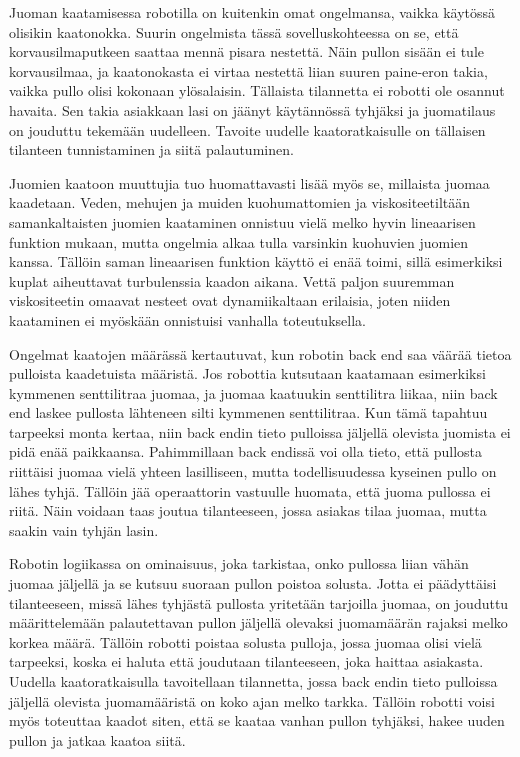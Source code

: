 Juoman kaatamisessa robotilla on kuitenkin omat ongelmansa, vaikka käytössä olisikin kaatonokka. Suurin ongelmista tässä sovelluskohteessa on se, että korvausilmaputkeen saattaa mennä pisara nestettä. Näin pullon sisään ei tule korvausilmaa, ja kaatonokasta ei virtaa nestettä liian suuren paine-eron takia, vaikka pullo olisi kokonaan ylösalaisin. Tällaista tilannetta ei robotti ole osannut havaita. Sen takia asiakkaan lasi on jäänyt käytännössä tyhjäksi ja juomatilaus on jouduttu tekemään uudelleen. Tavoite uudelle kaatoratkaisulle on tällaisen tilanteen tunnistaminen ja siitä palautuminen.

Juomien kaatoon muuttujia tuo huomattavasti lisää myös se, millaista juomaa kaadetaan. Veden, mehujen ja muiden kuohumattomien ja viskositeetiltään samankaltaisten juomien kaataminen onnistuu vielä melko hyvin lineaarisen funktion mukaan, mutta ongelmia alkaa tulla varsinkin kuohuvien juomien kanssa. Tällöin saman lineaarisen funktion käyttö ei enää toimi, sillä esimerkiksi kuplat aiheuttavat turbulenssia kaadon aikana. Vettä paljon suuremman viskositeetin omaavat nesteet ovat dynamiikaltaan erilaisia, joten niiden kaataminen ei myöskään onnistuisi vanhalla toteutuksella.

Ongelmat kaatojen määrässä kertautuvat, kun robotin back end saa väärää tietoa pulloista kaadetuista määristä. Jos robottia kutsutaan kaatamaan esimerkiksi kymmenen senttilitraa juomaa, ja juomaa kaatuukin senttilitra liikaa, niin back end laskee pullosta lähteneen silti kymmenen senttilitraa. Kun tämä tapahtuu tarpeeksi monta kertaa, niin back endin tieto pulloissa jäljellä olevista juomista ei pidä enää paikkaansa. Pahimmillaan back endissä voi olla tieto, että pullosta riittäisi juomaa vielä yhteen lasilliseen, mutta todellisuudessa kyseinen pullo on lähes tyhjä. Tällöin jää operaattorin vastuulle huomata, että juoma pullossa ei riitä. Näin voidaan taas joutua tilanteeseen, jossa asiakas tilaa juomaa, mutta saakin vain tyhjän lasin.

Robotin logiikassa on ominaisuus, joka tarkistaa, onko pullossa liian vähän juomaa jäljellä ja se kutsuu suoraan pullon poistoa solusta. Jotta ei päädyttäisi tilanteeseen, missä lähes tyhjästä pullosta yritetään tarjoilla juomaa, on jouduttu määrittelemään palautettavan pullon jäljellä olevaksi juomamäärän rajaksi melko korkea määrä. Tällöin robotti poistaa solusta pulloja, jossa juomaa olisi vielä tarpeeksi, koska ei haluta että joudutaan tilanteeseen, joka haittaa asiakasta. Uudella kaatoratkaisulla tavoitellaan tilannetta, jossa back endin tieto pulloissa jäljellä olevista juomamääristä on koko ajan melko tarkka. Tällöin robotti voisi myös toteuttaa kaadot siten, että se kaataa vanhan pullon tyhjäksi, hakee uuden pullon ja jatkaa kaatoa siitä.
